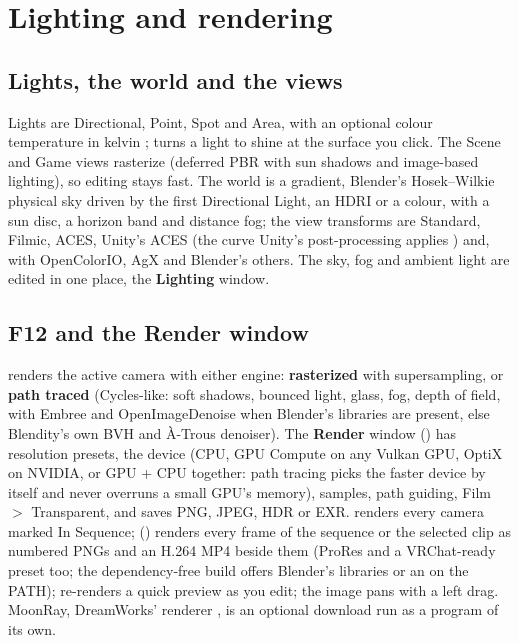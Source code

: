 \chapter{Lighting and rendering}
\label{ch:light}

\section{Lights, the world and the views}
Lights are Directional, Point, Spot and Area, with an optional colour temperature in kelvin \cite{Kang2002Design};
 turns a light to shine at the surface you click. The Scene and Game views rasterize (deferred PBR with
sun shadows and image-based lighting), so editing stays fast. The world is a gradient, Blender's Hosek--Wilkie
physical sky \cite{Hosek2012Analytic} driven by the first Directional Light, an HDRI or a colour, with a sun disc, a
horizon band and distance fog; the view transforms are Standard, Filmic, ACES, Unity's ACES (the curve Unity's
post-processing applies \cite{Hill2016ACES}) and, with OpenColorIO, AgX and Blender's others. The sky, fog and ambient
light are edited in one place, the \textbf{Lighting} window.

\section{F12 and the Render window}
 renders the active camera with either engine: \textbf{rasterized} with supersampling, or \textbf{path traced}
(Cycles-like: soft shadows, bounced light, glass, fog, depth of field, with Embree and OpenImageDenoise when Blender's
libraries are present, else Blendity's own BVH and \`A-Trous denoiser). The \textbf{Render} window () has
resolution presets, the device (CPU, GPU Compute on any Vulkan GPU, OptiX on NVIDIA, or GPU + CPU together: path tracing
picks the faster device by itself and never overruns a small GPU's memory), samples, path guiding, Film $>$
Transparent, and saves PNG, JPEG, HDR or EXR.  renders every camera marked In Sequence;
 () renders every frame of the sequence or the selected clip as numbered PNGs and an
H.264 MP4 beside them (ProRes and a VRChat-ready preset too; the dependency-free build offers Blender's libraries or an
 on the PATH);  re-renders a quick preview as you edit; the image pans with a left drag.
MoonRay, DreamWorks' renderer \cite{MoonRay2026}, is an optional download run as a program of its own.

